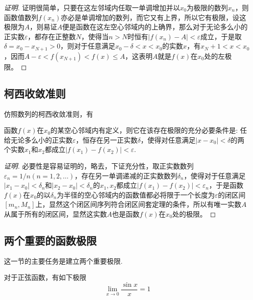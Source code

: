 \begin{proof}[证明]
证明很简单，只要在这左邻域内任取一单调增加并以$x_0$为极限的数列$x_n$，则函数值数列$f(x_n)$亦必是单调增加的数列，而它又有上界，所以它有极限，设这极限为$A$，则易证$A$便是函数在这左空心邻域内的上确界，那么对于无论多么小的正实数$\varepsilon$，都存在正整数$N$，使得当$n>N$时恒有$|f(x_n)-A|<\varepsilon$成立，于是取$\delta = x_0-x_{N+1}>0$，则对于任意满足$x_0-\delta<x<x_0$的实数$x$，有$x_N+1<x<x_0$，因而$A-\varepsilon<f(x_{N+1})<f(x) \leqslant A$，这表明$A$就是$f(x)$在$x_0$处的左极限。
\end{proof}

\subsection{柯西收敛准则}
\label{sec:cauchy-convergence-rule-of-function-limit}

仿照数列的柯西收敛准则，有
\begin{theorem}
  函数$f(x)$在$x_0$的某空心邻域内有定义，则它在该存在极限的充分必要条件是: 任给无论多么小的正实数$\varepsilon$，恒存在另一正实数$\delta$，使得对任意满足$|x-x_0|<\delta$的两个实数$x_1$和$x_2$都成立$|f(x_1)-f(x_2)|<\varepsilon$.
\end{theorem}

\begin{proof}[证明]
  必要性是容易证明的，略去，下证充分性，取正实数数列$\varepsilon_n=1/n(n=1,2,\ldots)$，存在另一单调递减的正实数数列$\delta_n$，使得对于任意满足$|x_1-x_0|<\delta_n$和$|x_2-x_0|<\delta_n$的$x_1,x_2$都成立$|f(x_1)-f(x_2)|<\varepsilon_n$，于是函数$f(x)$在$x_0$的以$\delta_n$为半径的空心邻域内的函数值都必将限于一个长度为$\varepsilon$的闭区间$[m_n,M_n]$上，显然这个闭区间序列符合闭区间套定理的条件，所以有唯一实数$A$从属于所有的闭区间，显然这实数$A$也是函数$f(x)$在$x_0$处的极限。
\end{proof}


\subsection{两个重要的函数极限}
\label{sec:two-important-function-limit}

这一节的主要任务是建立两个重要极限.

\begin{theorem}
  \label{theorem:sinx-over-x-to-1-when-x-to-0}
  对于正弦函数，有如下极限
  \[ \lim_{x \to 0} \frac{\sin{x}}{x} = 1 \]
\end{theorem}

